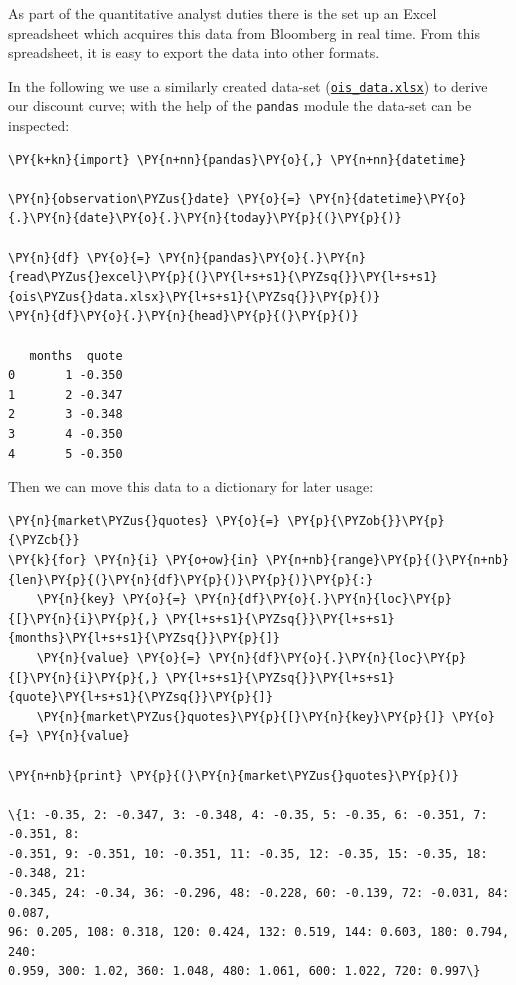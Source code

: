 As part of the quantitative analyst duties there is the set up an Excel spreadsheet which acquires this data from Bloomberg in real time. From this spreadsheet, it is easy to export the data into other formats.

In the following we use a similarly created data-set (\href{https://drive.google.com/file/d/1LCEDmheKqwPXFpJ25hFz32QI5im2UJO1/view?usp=sharing}{\texttt{ois\_data.xlsx}}) to derive our discount curve; with the help of the \texttt{pandas} module the data-set can be inspected:

\begin{tcolorbox}[breakable, size=fbox, boxrule=1pt, pad at break*=1mm,colback=cellbackground, colframe=cellborder]
\begin{Verbatim}[commandchars=\\\{\}]
\PY{k+kn}{import} \PY{n+nn}{pandas}\PY{o}{,} \PY{n+nn}{datetime}

\PY{n}{observation\PYZus{}date} \PY{o}{=} \PY{n}{datetime}\PY{o}{.}\PY{n}{date}\PY{o}{.}\PY{n}{today}\PY{p}{(}\PY{p}{)}

\PY{n}{df} \PY{o}{=} \PY{n}{pandas}\PY{o}{.}\PY{n}{read\PYZus{}excel}\PY{p}{(}\PY{l+s+s1}{\PYZsq{}}\PY{l+s+s1}{ois\PYZus{}data.xlsx}\PY{l+s+s1}{\PYZsq{}}\PY{p}{)}
\PY{n}{df}\PY{o}{.}\PY{n}{head}\PY{p}{(}\PY{p}{)}

   months  quote
0       1 -0.350
1       2 -0.347
2       3 -0.348
3       4 -0.350
4       5 -0.350
\end{Verbatim}
\end{tcolorbox}

Then we can move this data to a dictionary for later usage:
\begin{tcolorbox}[breakable, size=fbox, boxrule=1pt, pad at break*=1mm,colback=cellbackground, colframe=cellborder]
\begin{Verbatim}[commandchars=\\\{\}]
\PY{n}{market\PYZus{}quotes} \PY{o}{=} \PY{p}{\PYZob{}}\PY{p}{\PYZcb{}}
\PY{k}{for} \PY{n}{i} \PY{o+ow}{in} \PY{n+nb}{range}\PY{p}{(}\PY{n+nb}{len}\PY{p}{(}\PY{n}{df}\PY{p}{)}\PY{p}{)}\PY{p}{:}
    \PY{n}{key} \PY{o}{=} \PY{n}{df}\PY{o}{.}\PY{n}{loc}\PY{p}{[}\PY{n}{i}\PY{p}{,} \PY{l+s+s1}{\PYZsq{}}\PY{l+s+s1}{months}\PY{l+s+s1}{\PYZsq{}}\PY{p}{]}
    \PY{n}{value} \PY{o}{=} \PY{n}{df}\PY{o}{.}\PY{n}{loc}\PY{p}{[}\PY{n}{i}\PY{p}{,} \PY{l+s+s1}{\PYZsq{}}\PY{l+s+s1}{quote}\PY{l+s+s1}{\PYZsq{}}\PY{p}{]}
    \PY{n}{market\PYZus{}quotes}\PY{p}{[}\PY{n}{key}\PY{p}{]} \PY{o}{=} \PY{n}{value}
    
\PY{n+nb}{print} \PY{p}{(}\PY{n}{market\PYZus{}quotes}\PY{p}{)}

\{1: -0.35, 2: -0.347, 3: -0.348, 4: -0.35, 5: -0.35, 6: -0.351, 7: -0.351, 8:
-0.351, 9: -0.351, 10: -0.351, 11: -0.35, 12: -0.35, 15: -0.35, 18: -0.348, 21:
-0.345, 24: -0.34, 36: -0.296, 48: -0.228, 60: -0.139, 72: -0.031, 84: 0.087,
96: 0.205, 108: 0.318, 120: 0.424, 132: 0.519, 144: 0.603, 180: 0.794, 240:
0.959, 300: 1.02, 360: 1.048, 480: 1.061, 600: 1.022, 720: 0.997\}
\end{Verbatim}
\end{tcolorbox}

